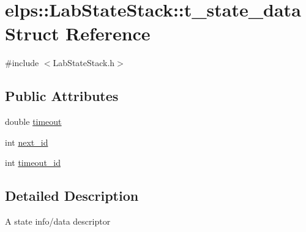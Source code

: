 \hypertarget{structelps_1_1_lab_state_stack_1_1t__state__data}{\section{elps\-:\-:Lab\-State\-Stack\-:\-:t\-\_\-state\-\_\-data Struct Reference}
\label{structelps_1_1_lab_state_stack_1_1t__state__data}
}


{\ttfamily \#include $<$Lab\-State\-Stack.\-h$>$}

\subsection*{Public Attributes}
\begin{DoxyCompactItemize}
\item 
double \hyperlink{structelps_1_1_lab_state_stack_1_1t__state__data_a8e9d1bb6ddfa12335fd73274f0aeae08}{timeout}
\item 
int \hyperlink{structelps_1_1_lab_state_stack_1_1t__state__data_ac4dcaf3ae601cca167790f614b3218d5}{next\-\_\-id}
\item 
int \hyperlink{structelps_1_1_lab_state_stack_1_1t__state__data_ae35e346075e8c9a36439ee0e250495e5}{timeout\-\_\-id}
\end{DoxyCompactItemize}


\subsection{Detailed Description}
A state info/data descriptor 


